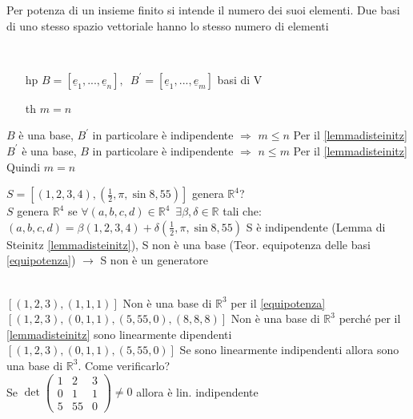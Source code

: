 \begin{teorema}\label{equipotenza}
	Per potenza di un insieme finito si intende il numero dei suoi elementi. Due basi di uno stesso spazio vettoriale hanno lo stesso numero di elementi
	\begin{dimostrazione}
		\phantom{}\\
		\begin{itemize}
			\item[hp] $B=[\underline{e}_1,...,\underline{e}_n],\phantom{1}B^{'}=[\underline{e}_1,...,\underline{e}_m]$ basi di V
			\item[th] $m=n$
		\end{itemize}
		$B$ è una base, $B^{'}$ in particolare è indipendente $\Longrightarrow$ $m\leqslant n$ Per il \ref{lemmadisteinitz}\\
		$B^{'}$ è una base, $B$ in particolare è indipendente $\Longrightarrow$ $n\leqslant m$ Per il \ref{lemmadisteinitz}\\
		Quindi $m=n$
	\end{dimostrazione}
	\begin{esercizio}
		$S=[(1,2,3,4),(\frac{1}{2},\pi,\sin 8, 55)]$ genera $\mathbb{R}^4$?\\
		$S$ genera $\mathbb{R}^4$ se $\forall(a,b,c,d)\in\mathbb{R}^4\phantom{1}\exists\beta,\delta\in\mathbb{R}$ tali che:\\ 
		$(a,b,c,d)=\beta(1,2,3,4)+\delta(\frac{1}{2},\pi,\sin 8, 55)$
		S è indipendente (Lemma di Steinitz \ref{lemmadisteinitz}), S non è una base (Teor. equipotenza delle basi \ref{equipotenza}) $\longrightarrow$ S non è un generatore
	\end{esercizio}
	\begin{osservazione}
		\phantom{}\\
		$[(1,2,3),(1,1,1)]$ Non è una base di $\mathbb{R}^3$ per il \ref{equipotenza}\\
		$[(1,2,3),(0,1,1),(5,55,0),(8,8,8)]$ Non è una base di $\mathbb{R}^3$ perché per il \ref{lemmadisteinitz} sono linearmente dipendenti\\
		$[(1,2,3),(0,1,1),(5,55,0)]$ Se sono linearmente indipendenti allora sono una base di $\mathbb{R}^3$. Come verificarlo?\\
		Se $\det\begin{pmatrix}
			1 & 2 & 3\\
			0 & 1 & 1\\
			5 & 55& 0
		\end{pmatrix}\neq 0$ allora è lin. indipendente
	\end{osservazione}
\end{teorema}

